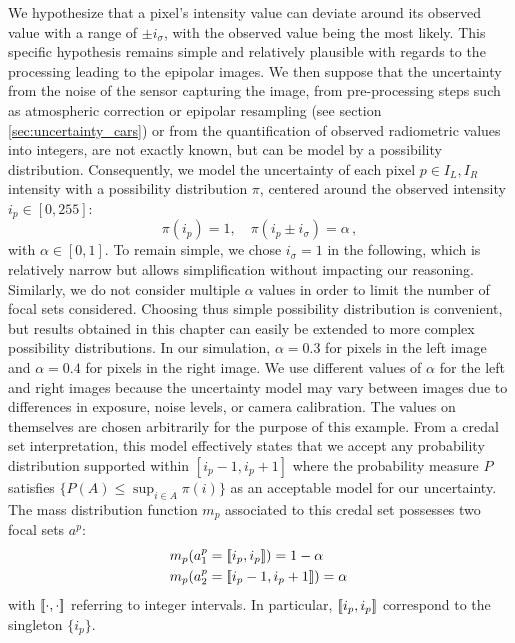 We hypothesize that a pixel's intensity value can deviate around its observed value with a range of $\pm i_\sigma$, with the observed value being the most likely. This specific hypothesis remains simple and relatively plausible with regards to the processing leading to the epipolar images. We then suppose that the uncertainty from the noise of the sensor capturing the image, from pre-processing steps such as atmospheric correction or epipolar resampling (see section \ref{sec:uncertainty_cars}) or from the quantification of observed radiometric values into integers, are not exactly known, but can be model by a possibility distribution. Consequently, we model the uncertainty of each pixel $p\in I_L,I_R$ intensity with a possibility distribution $\pi$, centered around the observed intensity $i_p\in[0,255]$:
\begin{equation}
    \pi(i_p)=1,\quad \pi(i_p\pm i_\sigma)=\alpha\,,
\end{equation}\label{eq:pixel_possibility}
with $\alpha \in [0,1]$. To remain simple, we chose $i_\sigma=1$ in the following, which is relatively narrow but allows simplification without impacting our reasoning. Similarly, we do not consider multiple $\alpha$ values in order to limit the number of focal sets considered. Choosing thus simple possibility distribution is convenient, but results obtained in this chapter can easily be extended to more complex possibility distributions. In our simulation, $\alpha = 0.3$ for pixels in the left image and $\alpha = 0.4$ for pixels in the right image. We use different values of $\alpha$ for the left and right images because the uncertainty model may vary between images due to differences in exposure, noise levels, or camera calibration. The values on themselves are chosen arbitrarily for the purpose of this example. From a credal set interpretation, this model effectively states that we accept any probability distribution supported within $[i_p - 1, i_p + 1]$ where the probability measure $P$ satisfies $\{P(A) \leq \sup_{i \in A} \pi(i)\}$ as an acceptable model for our uncertainty. The mass distribution function $m_p$ associated to this credal set possesses two focal sets $a^p$:
\begin{eqnarray}
    &m_p(a^p_1={[\![} i_p, i_p{]\!]})=1-\alpha\,\nonumber\\
    &m_p(a^p_2={[\![} i_p-1, i_p + 1{]\!]})=\alpha\,\label{eq:pixel_mass}
\end{eqnarray}
with ${[\![}\cdot, \cdot{]\!]}$ referring to integer intervals. In particular, ${[\![} i_p, i_p{]\!]}$ correspond to the singleton $\{i_p\}$.

